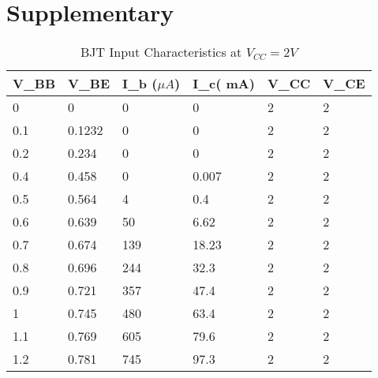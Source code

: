 \documentclass{scrartcl}
\newcommand{\1}{\mathbbm{1}}
\begin{document}
\section{Supplementary}
\label{sec:supplementary}
\begin{table}[!ht]
        \centering
        \begin{tabular}{|l|l|l|l|l|l|}
        \hline
            \textbf{V\_BB} & \textbf{V\_BE} & \textbf{I\_b ($\mu A$)} & \textbf{I\_c( mA)} & \textbf{V\_CC} & \textbf{V\_CE} \\ \hline
            0 & 0 & 0 & 0 & 2 & 2 \\ \hline
            0.1 & 0.1232 & 0 & 0 & 2 & 2 \\ \hline
            0.2 & 0.234 & 0 & 0 & 2 & 2 \\ \hline
            0.4 & 0.458 & 0 & 0.007 & 2 & 2 \\ \hline
            0.5 & 0.564 & 4 & 0.4 & 2 & 2 \\ \hline
            0.6 & 0.639 & 50 & 6.62 & 2 & 2 \\ \hline
            0.7 & 0.674 & 139 & 18.23 & 2 & 2 \\ \hline
            0.8 & 0.696 & 244 & 32.3 & 2 & 2 \\ \hline
            0.9 & 0.721 & 357 & 47.4 & 2 & 2 \\ \hline
            1 & 0.745 & 480 & 63.4 & 2 & 2 \\ \hline
            1.1 & 0.769 & 605 & 79.6 & 2 & 2 \\ \hline
            1.2 & 0.781 & 745 & 97.3 & 2 & 2 \\ \hline
        \end{tabular}
        \caption{BJT Input Characteristics at $V_{CC} = 2V$}
        \label{tab:input2v}
    \end{table}
\end{document}
